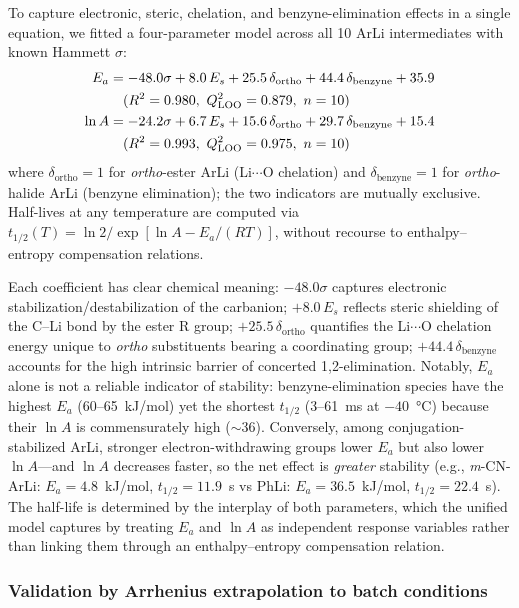 \documentclass[journal=jcisd8,manuscript=article]{achemso}
\begin{document}
To capture electronic, steric, chelation, and benzyne-elimination effects in a single equation, we fitted a four-parameter model across all 10 ArLi intermediates with known Hammett $\sigma$:
\begin{align}
E_a &= -48.0\sigma + 8.0\,E_s + 25.5\,\delta_{\mathrm{ortho}} + 44.4\,\delta_{\mathrm{benzyne}} + 35.9 \label{eq:unified-Ea} \\
    &\quad (R^2 = 0.980,\ Q^2_{\mathrm{LOO}} = 0.879,\ n = 10) \notag \\
\ln A &= -24.2\sigma + 6.7\,E_s + 15.6\,\delta_{\mathrm{ortho}} + 29.7\,\delta_{\mathrm{benzyne}} + 15.4 \label{eq:unified-lnA} \\
    &\quad (R^2 = 0.993,\ Q^2_{\mathrm{LOO}} = 0.975,\ n = 10) \notag
\end{align}
where $\delta_{\mathrm{ortho}} = 1$ for \textit{ortho}-ester ArLi (Li$\cdots$O chelation) and $\delta_{\mathrm{benzyne}} = 1$ for \textit{ortho}-halide ArLi (benzyne elimination); the two indicators are mutually exclusive.
Half-lives at any temperature are computed via $t_{1/2}(T) = \ln 2 / \exp[\ln A - E_a/(RT)]$, without recourse to enthalpy--entropy compensation relations.

Each coefficient has clear chemical meaning:
$-48.0\sigma$ captures electronic stabilization/destabilization of the carbanion;
$+8.0\,E_s$ reflects steric shielding of the C--Li bond by the ester R group;
$+25.5\,\delta_{\mathrm{ortho}}$ quantifies the Li$\cdots$O chelation energy unique to \textit{ortho} substituents bearing a coordinating group;
$+44.4\,\delta_{\mathrm{benzyne}}$ accounts for the high intrinsic barrier of concerted 1,2-elimination.
Notably, $E_a$ alone is not a reliable indicator of stability: benzyne-elimination species have the highest $E_a$ (60--65~kJ/mol) yet the shortest $t_{1/2}$ (3--61~ms at $-40$~\si{\celsius}) because their $\ln A$ is commensurately high ($\sim$36).
Conversely, among conjugation-stabilized ArLi, stronger electron-withdrawing groups lower $E_a$ but also lower $\ln A$---and $\ln A$ decreases faster, so the net effect is \textit{greater} stability (e.g., \textit{m}-CN-ArLi: $E_a = 4.8$~kJ/mol, $t_{1/2} = 11.9$~s vs PhLi: $E_a = 36.5$~kJ/mol, $t_{1/2} = 22.4$~s).
The half-life is determined by the interplay of both parameters, which the unified model captures by treating $E_a$ and $\ln A$ as independent response variables rather than linking them through an enthalpy--entropy compensation relation.

\subsubsection{Validation by Arrhenius extrapolation to batch conditions}
\end{document}
